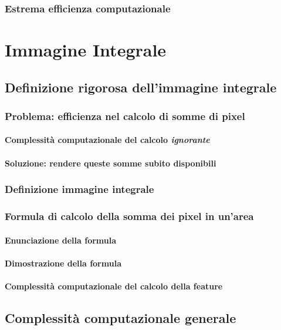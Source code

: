             \subsubsection{Estrema efficienza computazionale}
    \section{Immagine Integrale}
    \label{sec:integral_image}
        \subsection{Definizione rigorosa dell'immagine integrale}
            \subsubsection{Problema: efficienza nel calcolo di somme di pixel}
                \paragraph{Complessità computazionale del calcolo \emph{ignorante}}
                \paragraph{Soluzione: rendere queste somme subito disponibili}
            \subsubsection{Definizione immagine integrale}
            \subsubsection{Formula di calcolo della somma dei pixel in un'area}
                \paragraph{Enunciazione della formula}
                \paragraph{Dimostrazione della formula}
                \paragraph{Complessità computazionale del calcolo della feature}
        \subsection{Complessità computazionale generale}
